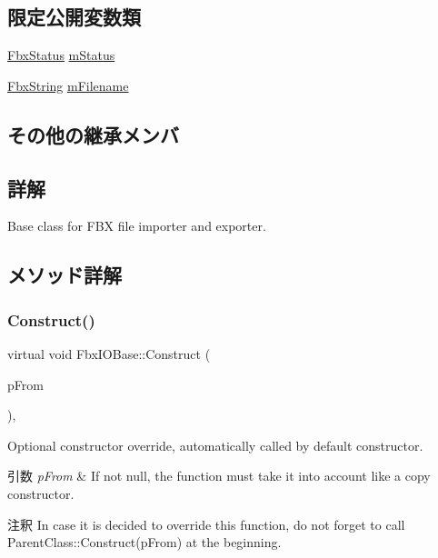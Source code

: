 \subsection*{限定公開変数類}
\begin{DoxyCompactItemize}
\item 
\hyperlink{class_fbx_status}{Fbx\+Status} \hyperlink{class_fbx_i_o_base_a7fd6efae8ba3697e4d242dc5412289aa}{m\+Status}
\item 
\hyperlink{class_fbx_string}{Fbx\+String} \hyperlink{class_fbx_i_o_base_a62dd6d12440a14577414ba18ed8dfa9f}{m\+Filename}
\end{DoxyCompactItemize}
\subsection*{その他の継承メンバ}


\subsection{詳解}
Base class for F\+BX file importer and exporter. 

\subsection{メソッド詳解}
\mbox{\label{class_fbx_i_o_base_aed70ed1326f8fb1cc96e2086c73722f8}} 
\subsubsection{\texorpdfstring{Construct()}{Construct()}}
{\footnotesize\ttfamily virtual void Fbx\+I\+O\+Base\+::\+Construct (\begin{DoxyParamCaption}\item[{const \hyperlink{class_fbx_object}{Fbx\+Object} $\ast$}]{p\+From }\end{DoxyParamCaption})\hspace{0.3cm}{\ttfamily [protected]}, {\ttfamily [virtual]}}

Optional constructor override, automatically called by default constructor. 
\begin{DoxyParams}{引数}
{\em p\+From} & If not null, the function must take it into account like a copy constructor. \\
\hline
\end{DoxyParams}
\begin{DoxyRemark}{注釈}
In case it is decided to override this function, do not forget to call Parent\+Class\+::\+Construct(p\+From) at the beginning. 
\end{DoxyRemark}


